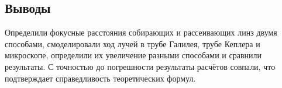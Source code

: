 \documentclass[a4paper, 12pt]{article}%
\begin{document}
\subsection*{Выводы}
Определили фокусные расстояния собирающих и рассеивающих линз двумя способами, смоделировали ход лучей в трубе Галилея, трубе Кеплера и микроскопе, определили их увеличение разными способами и сравнили результаты. С точностью до погрешности результаты расчётов совпали, что подтверждает справедливость теоретических формул.
\end{document}
